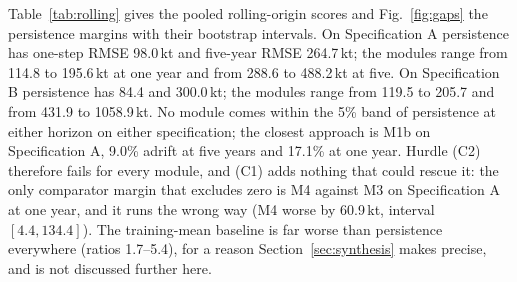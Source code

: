 Table~\ref{tab:rolling} gives the pooled rolling-origin scores and Fig.~\ref{fig:gaps} the persistence margins with their bootstrap intervals. On Specification A persistence has one-step RMSE 98.0\,kt and five-year RMSE 264.7\,kt; the modules range from 114.8 to 195.6\,kt at one year and from 288.6 to 488.2\,kt at five. On Specification B persistence has 84.4 and 300.0\,kt; the modules range from 119.5 to 205.7 and from 431.9 to 1058.9\,kt. No module comes within the 5\% band of persistence at either horizon on either specification; the closest approach is M1b on Specification A, 9.0\% adrift at five years and 17.1\% at one year. Hurdle (C2) therefore fails for every module, and (C1) adds nothing that could rescue it: the only comparator margin that excludes zero is M4 against M3 on Specification A at one year, and it runs the wrong way (M4 worse by 60.9\,kt, interval $[4.4, 134.4]$). The training-mean baseline is far worse than persistence everywhere (ratios 1.7--5.4), for a reason Section~\ref{sec:synthesis} makes precise, and is not discussed further here.

